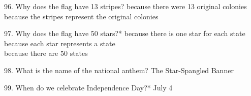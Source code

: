 \documentclass[avery5371,frame]{flashcards}
\begin{document}
        \begin{flashcard}{96. Why does the flag have 13 stripes?}
        {because there were 13 original colonies\\because the stripes represent the original colonies}
        \end{flashcard}
        \begin{flashcard}{97. Why does the flag have 50 stars?*}
        {because there is one star for each state\\because each star represents a state\\because there are 50 states}
        \end{flashcard}
        \begin{flashcard}{98. What is the name of the national anthem?}
        {The Star-Spangled Banner}
        \end{flashcard}
        \begin{flashcard}{99. When do we celebrate Independence Day?*}
        {July 4}
        \end{flashcard}
\end{document}
